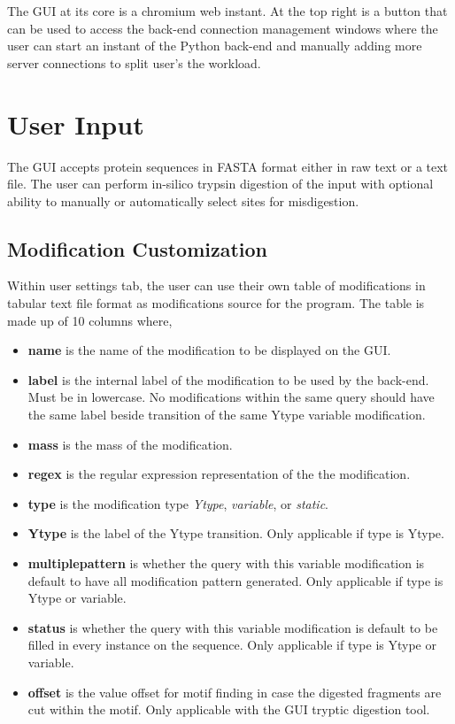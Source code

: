 \documentclass[../manual.tex]{subfiles}
\begin{document}
The GUI at its core is a chromium web instant. At the top right is a button that can be used to access the back-end connection management windows where the user can start an instant of the Python back-end and manually adding more server connections to split user's the workload.\par

\section{User Input}
The GUI accepts protein sequences in FASTA format either in raw text or a text file. The user can perform in-silico trypsin digestion of the input with optional ability to manually or automatically select sites for misdigestion.

\subsection{Modification Customization}
Within user settings tab, the user can use their own table of modifications in tabular text file format as modifications source for the program. The table is made up of 10 columns where,\par
\begin{itemize}
    \item \textbf{name} is the name of the modification to be displayed on the GUI.
    \item \textbf{label} is the internal label of the modification to be used by the back-end. Must be in lowercase. No modifications within the same query should have the same label beside transition of the same Ytype variable modification.
    \item \textbf{mass} is the mass of the modification.
    \item \textbf{regex} is the regular expression representation of the the modification.
    \item \textbf{type} is the modification type \emph{Ytype}, \emph{variable}, or \emph{static}.
    \item \textbf{Ytype} is the label of the Ytype transition. Only applicable if type is Ytype.
    \item \textbf{multiplepattern} is whether the query with this variable modification is default to have all modification pattern generated. Only applicable if type is Ytype or variable.
    \item \textbf{status} is whether the query with this variable modification is default to be filled in every instance on the sequence. Only applicable if type is Ytype or variable.
    \item \textbf{offset} is the value offset for motif finding in case the digested fragments are cut within the motif. Only applicable with the GUI tryptic digestion tool.
\end{itemize}
\end{document}
